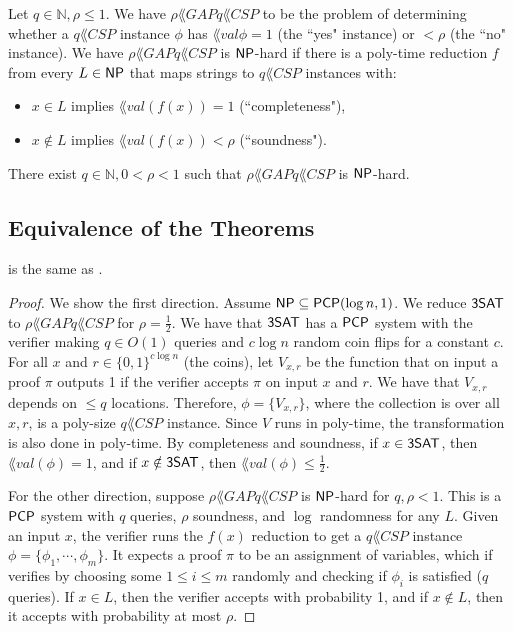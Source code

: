 \begin{definition}
Let $q \in \mathbb{N}, \rho \le 1$. We have $\rho\lang{GAP}q\lang{CSP}$ to be the problem of determining whether a $q\lang{CSP}$ instance $\phi$ has $\lang{val}\phi = 1$ (the ``yes" instance) or $< \rho$ (the ``no" instance). We have $\rho\lang{GAP}q\lang{CSP}$ is ${\mathsf{NP}}$-hard if there is a poly-time reduction $f$ from every $L \in {\ensuremath{\mathsf{NP}}}$ that maps strings to $q\lang{CSP}$ instances with:
\begin{itemize}
\item $x \in L$ implies $\lang{val}(f(x)) = 1$ (``completeness"),
\item $x \notin L$ implies $\lang{val}(f(x)) < \rho$ (``soundness").
\end{itemize}

\begin{theorem}
\label{thm:3_pcp}
There exist $q \in \mathbb{N}, 0 < \rho < 1$ such that $\rho\lang{GAP}q\lang{CSP}$ is ${\mathsf{NP}}$-hard.
\end{theorem}

\subsection{Equivalence of the Theorems}
\begin{theorem}
 is the same as .
\end{theorem}

\begin{proof}
We show the first direction. Assume ${\mathsf{NP}} \subseteq {\ensuremath{\mathsf{PCP}}}(\log n, 1)$. We reduce ${\mathsf{3SAT}}$ to $\rho\lang{GAP}q\lang{CSP}$ for $\rho = \frac{1}{2}$. We have that ${\mathsf{3SAT}}$ has a ${\mathsf{PCP}}$ system with the verifier making $q \in O(1)$ queries and $c \log n$ random coin flips for a constant $c$. For all $x$ and $r \in \{0, 1\}^{c \log n}$ (the coins), let $V_{x, r}$ be the function that on input a proof $\pi$ outputs 1 if the verifier accepts $\pi$ on input $x$ and $r$. We have that $V_{x, r}$ depends on $\le q$ locations. Therefore, $\phi = \{V_{x, r}\}$, where the collection is over all $x, r$, is a poly-size $q\lang{CSP}$ instance. Since $V$ runs in poly-time, the transformation is also done in poly-time. By completeness and soundness, if $x \in {\ensuremath{\mathsf{3SAT}}}$, then $\lang{val}(\phi) = 1$, and if $x \notin {\ensuremath{\mathsf{3SAT}}}$, then $\lang{val}(\phi) \le \frac{1}{2}$. 

\par For the other direction, suppose $\rho\lang{GAP}q\lang{CSP}$ is ${\mathsf{NP}}$-hard for $q, \rho < 1$. This is a ${\mathsf{PCP}}$ system with $q$ queries, $\rho$ soundness, and $\log$ randomness for any $L$. Given an input $x$, the verifier runs the $f(x)$ reduction to get a $q\lang{CSP}$ instance $\phi = \{\phi_1, \cdots, \phi_m\}$. It expects a proof $\pi$ to be an assignment of variables, which if verifies by choosing some $1 \le i \le m$ randomly and checking if $\phi_i$ is satisfied ($q$ queries). If $x \in L$, then the verifier accepts with probability 1, and if $x \notin L$, then it accepts with probability at most $\rho$. 
\end{proof}


\end{definition}

